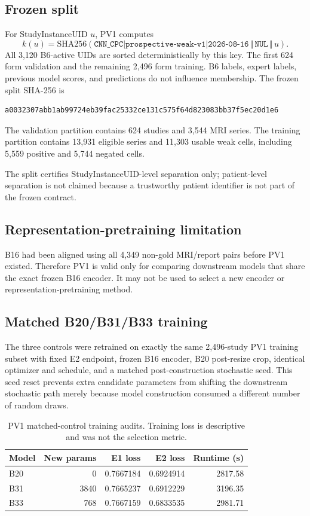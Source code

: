 \documentclass[preprint,12pt]{elsarticle}
\begin{document}
\subsection{Frozen split}
For StudyInstanceUID $u$, PV1 computes
\begin{equation}
k(u)=\mathrm{SHA256}(\texttt{CNN\_CPC|prospective-weak-v1|2026-08-16}\,\Vert\,\texttt{NUL}\,\Vert\,u).
\end{equation}
All 3,120 B6-active UIDs are sorted deterministically by this key. The first 624 form validation and the remaining 2,496 form training. B6 labels, expert labels, previous model scores, and predictions do not influence membership. The frozen split SHA-256 is
\begin{verbatim}
a0032307abb1ab99724eb39fac25332ce131c575f64d823083bb37f5ec20d1e6
\end{verbatim}
The validation partition contains 624 studies and 3,544 MRI series. The training partition contains 13,931 eligible series and 11,303 usable weak cells, including 5,559 positive and 5,744 negated cells.

The split certifies StudyInstanceUID-level separation only; patient-level separation is not claimed because a trustworthy patient identifier is not part of the frozen contract.

\subsection{Representation-pretraining limitation}
B16 had been aligned using all 4,349 non-gold MRI/report pairs before PV1 existed. Therefore PV1 is valid only for comparing downstream models that share the exact frozen B16 encoder. It may not be used to select a new encoder or representation-pretraining method.

\subsection{Matched B20/B31/B33 training}
The three controls were retrained on exactly the same 2,496-study PV1 training subset with fixed E2 endpoint, frozen B16 encoder, B20 post-resize crop, identical optimizer and schedule, and a matched post-construction stochastic seed. This seed reset prevents extra candidate parameters from shifting the downstream stochastic path merely because model construction consumed a different number of random draws.

\begin{table}[ht]
\centering
\caption{PV1 matched-control training audits. Training loss is descriptive and was not the selection metric.}
\label{tab:pv1train}
\begin{tabular}{lrrrr}
\toprule
Model & New params & E1 loss & E2 loss & Runtime (s) \\
\midrule
B20 & 0 & 0.7667184 & 0.6924914 & 2817.58 \\
B31 & 3840 & 0.7665237 & 0.6912229 & 3196.35 \\
B33 & 768 & 0.7667159 & 0.6833535 & 2981.71 \\
\bottomrule
\end{tabular}
\end{table}
\end{document}
